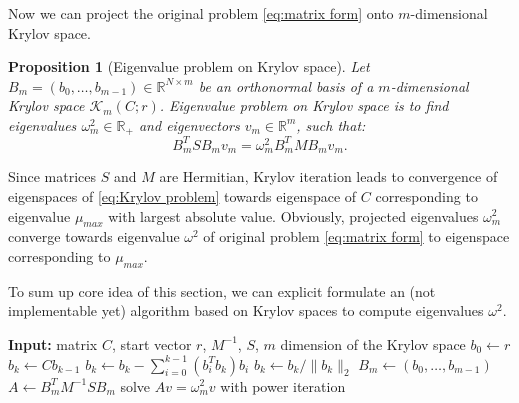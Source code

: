 \documentclass[a4paper,11pt,bibliography=totoc,listof=totoc,headinclude=true,cleardoublepage=empty,oneside]{scrbook}
\newtheorem{prop}[theorem]{Proposition}
\newcommand{\R}{\mathbb{R}}
\begin{document}
Now we can project the original problem \eqref{eq:matrix form} onto $m$-dimensional Krylov space. 
\begin{prop}[Eigenvalue problem on Krylov space]
    Let $B_m = (b_0, \dots, b_{m-1}) \in \R^{N\times m}$ be an orthonormal basis of a $m$-dimensional Krylov space $\mathcal{K}_m(C; r)$. Eigenvalue problem on Krylov space is to find eigenvalues $\omega_m^2 \in \R_+$ and eigenvectors $v_m\in\R^m$, such that:
    \begin{equation}\label{eq:Krylov problem}
        B_m^T S B_m v_m = \omega_m^2 B_m^T M B_m v_m.
    \end{equation}
\end{prop}

Since matrices $S$ and $M$ are Hermitian, Krylov iteration leads to convergence of eigenspaces of \eqref{eq:Krylov problem} towards eigenspace of $C$ corresponding to eigenvalue $\mu_{max}$ with largest absolute value. Obviously, projected eigenvalues $\omega_m^2$ converge towards eigenvalue $\omega^2$ of original problem \eqref{eq:matrix form} to eigenspace corresponding to $\mu_{max}$.

To sum up core idea of this section, we can explicit formulate an (not implementable yet) algorithm based on Krylov spaces to compute eigenvalues $\omega^2$.
\begin{algorithm}[H]
\caption{Krylov eigenvalue solver}\label{alg:Krylov base}
    \begin{algorithmic}
        \State \textbf{Input:} matrix $C$, start vector $r$, $M^{-1}$, $S$, $m$ dimension of the Krylov space
        \State $b_0 \gets r$
            \State $b_k \gets Cb_{k-1}$ 
            \State $b_{k} \gets b_k - \sum_{i=0}^{k-1} (b_i^T b_k) b_i$ 
            \State $ b_k \gets b_{k}/\|b_{k}\|_2 $
        \EndFor
        \State $B_m \gets (b_0, \dots, b_{m-1})$ 
        \State $A \gets B_m^T M^{-1}S B_m$
        \State solve $Av = \omega_m^2 v$ with power iteration

    \end{algorithmic}
\end{algorithm}
\end{document}
